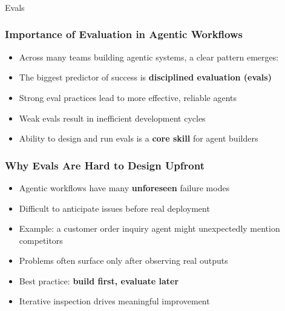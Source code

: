 \begin{frame}[fragile]\frametitle{}
\begin{center}
{\Large Evals}
\end{center}
\end{frame}

\begin{frame}[fragile]\frametitle{Importance of Evaluation in Agentic Workflows}
      \begin{itemize}
        \item Across many teams building agentic systems, a clear pattern emerges:
        \item The biggest predictor of success is \textbf{disciplined evaluation (evals)}
        \item Strong eval practices lead to more effective, reliable agents
        \item Weak evals result in inefficient development cycles
        \item Ability to design and run evals is a \textbf{core skill} for agent builders
      \end{itemize}
\end{frame}

\begin{frame}[fragile]\frametitle{Why Evals Are Hard to Design Upfront}
      \begin{itemize}
        \item Agentic workflows have many \textbf{unforeseen} failure modes
        \item Difficult to anticipate issues before real deployment
        \item Example: a customer order inquiry agent might unexpectedly mention competitors
        \item Problems often surface only after observing real outputs
        \item Best practice: \textbf{build first, evaluate later}
        \item Iterative inspection drives meaningful improvement
      \end{itemize}
\end{frame}

